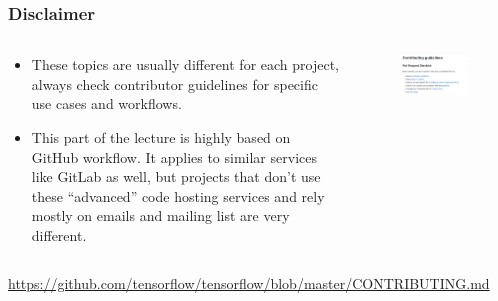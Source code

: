 \documentclass[aspectratio=169]{beamer}              %
\begin{document}
\begin{frame}
	\frametitle{Disclaimer}
	
\begin{columns}
\begin{column}{0.5\textwidth}
	\begin{block}{}
		\begin{itemize}
			\item These topics are usually different for each project, always check contributor guidelines for specific use cases and workflows.
			\item This part of the lecture is highly based on GitHub workflow. It applies to similar services like GitLab as well, but projects that don't use these ``advanced'' code hosting services and rely mostly on emails and mailing list are very different.
		\end{itemize}
	\end{block}
\end{column}

\begin{column}{0.5\textwidth}
	\begin{figure}[ht!]
	\begin{center}
  	  \includegraphics[width=0.95\textwidth]{img/gh-contributor-guidelines.png}
	\end{center}
	\end{figure}
\end{column}
\end{columns}

\tiny\url{https://github.com/tensorflow/tensorflow/blob/master/CONTRIBUTING.md}
\end{frame}
\end{document}
